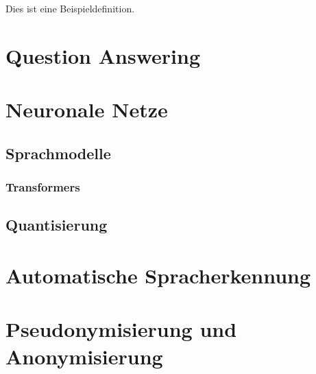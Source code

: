 \begin{definition}[Beispieldefinition]
Dies ist eine Beispieldefinition.
\end{definition}

\section{Question Answering}

\section{Neuronale Netze}
\subsection{Sprachmodelle}
\subsubsection{Transformers}
\subsection{Quantisierung}

\section{Automatische Spracherkennung}

\section{Pseudonymisierung und Anonymisierung}
